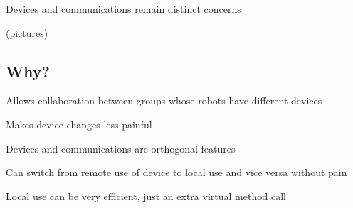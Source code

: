 Devices and communications remain distinct concerns

(pictures)


\subsection{Why?}

Allows collaboration between groups whose robots have different devices

Makes device changes less painful

Devices and communications are orthogonal features

Can switch from remote use of device to local use and vice versa without pain

Local use can be very efficient, just an extra virtual method call


